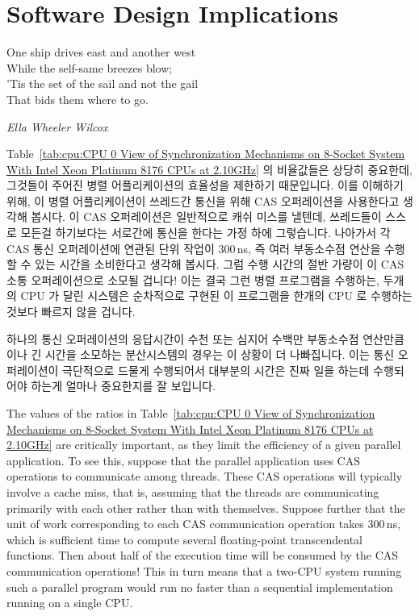 
\section{Software Design Implications}
\label{sec:cpu:Software Design Implications}
%
\epigraph{One ship drives east and another west \\
	  While the self-same breezes blow; \\
	  'Tis the set of the sail and not the gail \\
	  That bids them where to go.}
	 {\emph{Ella Wheeler Wilcox}}

Table~\ref{tab:cpu:CPU 0 View of Synchronization Mechanisms on 8-Socket System With Intel Xeon Platinum 8176 CPUs at 2.10GHz}
의 비율값들은 상당히 중요한데, 그것들이 주어진 병렬 어플리케이션의 효율성을
제한하기 때문입니다.
이를 이해하기 위해, 이 병렬 어플리케이션이 쓰레드간 통신을 위해 CAS
오퍼레이션을 사용한다고 생각해 봅시다.
이 CAS 오퍼레이션은 일반적으로 캐쉬 미스를 낼텐데, 쓰레드들이 스스로 모든걸
하기보다는 서로간에 통신을 한다는 가정 하에 그렇습니다.
나아가서 각 CAS 통신 오퍼레이션에 연관된 단위 작업이 300\,ns, 즉 여러
부동소수점 연산을 수행할 수 있는 시간을 소비한다고 생각해 봅시다.
그럼 수행 시간의 절반 가량이 이 CAS 소통 오퍼레이션으로 소모될 겁니다!
이는 결국 그런 병렬 프로그램을 수행하는, 두개의 CPU 가 달린 시스템은 순차적으로
구현된 이 프로그램을 한개의 CPU 로 수행하는 것보다 빠르지 않을 겁니다.

하나의 통신 오퍼레이션의 응답시간이 수천 또는 심지어 수백만 부동소수점
연산만큼이나 긴 시간을 소모하는 분산시스템의 경우는 이 상황이 더 나빠집니다.
이는 통신 오퍼레이션이 극단적으로 드물게 수행되어서 대부분의 시간은 진짜 일을
하는데 수행되어야 하는게 얼마나 중요한지를 잘 보입니다.

\iffalse

The values of the ratios in
Table~\ref{tab:cpu:CPU 0 View of Synchronization Mechanisms on 8-Socket System With Intel Xeon Platinum 8176 CPUs at 2.10GHz}
are critically important, as they limit the
efficiency of a given parallel application.
To see this, suppose that the parallel application uses CAS
operations to communicate among threads.
These CAS operations will typically involve a cache miss, that is, assuming
that the threads are communicating primarily with each other rather than
with themselves.
Suppose further that the unit of work corresponding to each CAS communication
operation takes 300\,ns, which is sufficient time to compute several
floating-point transcendental functions.
Then about half of the execution time will be consumed by the CAS
communication operations!
This in turn means that a two-CPU system running such a parallel program
would run no faster than a sequential implementation running on a
single CPU\@.

